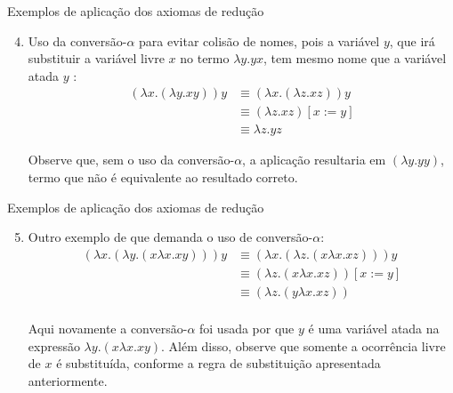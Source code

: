 \begin{frame}[fragile]{Exemplos de aplicação dos axiomas de redução}

    \begin{enumerate}
        \setcounter{enumi}{3}
        \item Uso da conversão-$\alpha$ para evitar colisão de nomes, pois a variável $y$, que
        irá substituir a variável livre $x$ no termo $\lambda y.yx$, tem mesmo nome que a
        variável atada $y$ :
        \begin{align*}
            (\lambda x.(\lambda y.xy))y & \equiv (\lambda x.(\lambda z.xz))y \\
            & \equiv (\lambda z.xz)[x:=y] \\
            & \equiv \lambda z.yz
        \end{align*}

        Observe que, sem o uso da conversão-$\alpha$, a aplicação resultaria em $(\lambda y.yy)$,
        termo que não é equivalente ao resultado correto.

    \end{enumerate}

\end{frame}

\begin{frame}[fragile]{Exemplos de aplicação dos axiomas de redução}

    \begin{enumerate}
        \setcounter{enumi}{4}
        \item Outro exemplo de que demanda o uso de conversão-$\alpha$:
        \begin{align*}
            (\lambda x.(\lambda y.(x\lambda x.xy)))y &\equiv (\lambda x.(\lambda z.(x\lambda x.xz)))y\\
            &\equiv (\lambda z.(x\lambda x.xz))[x:=y]\\
            &\equiv (\lambda z.(y\lambda x.xz))\\
        \end{align*}

        Aqui novamente a conversão-$\alpha$ foi usada por que $y$ é uma variável atada na
        expressão $\lambda y.(x\lambda x.xy)$. Além disso, observe que somente a ocorrência
        livre de $x$ é substituída, conforme a regra de substituição apresentada 
        anteriormente.
    \end{enumerate}

\end{frame}

